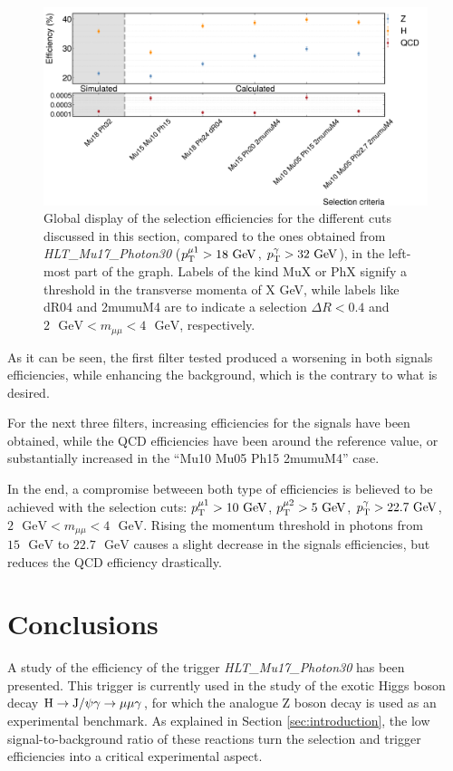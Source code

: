 \documentclass[11pt, a4paper]{article}
\newcommand{\GeV}{\textrm{ }\mathrm{GeV}}
\renewcommand{\H}{{\rm H}}
\newcommand{\JPsi}{{\rm J}/\psi}
\newcommand{\pt}{p_{\rm T}}
\begin{document}
\begin{figure}[htbp]
    \centering
    \includegraphics[width=1\linewidth]{images/eff_comparison.pdf}
    \caption{Global display of the selection efficiencies for the different cuts discussed in this section, compared to the ones obtained from {\it HLT\_Mu17\_Photon30} ($\pt^{\mu 1} > 18\GeV$, $\pt^{\gamma} > 32\GeV$), in the left-most part of the graph. Labels of the kind MuX or PhX signify a threshold in the transverse momenta of X GeV, while labels like dR04 and 2mumuM4 are to indicate a selection $\Delta R < 0.4$ and $2\GeV < m_{\mu\mu} < 4\GeV$, respectively.
    \label{im:eff_comparison}}
\end{figure}

As it can be seen, the first filter tested produced a worsening in both signals efficiencies, while enhancing the background, which is the contrary to what is desired.

For the next three filters, increasing efficiencies for the signals have been obtained, while the QCD efficiencies have been around the reference value, or substantially increased in the ``Mu10 Mu05 Ph15 2mumuM4'' case.

In the end, a compromise betweeen both type of efficiencies is believed to be achieved with the selection cuts: $\pt^{\mu 1} > 10\GeV$, $\pt^{\mu 2} > 5\GeV$, $\pt^{\gamma} > 22.7\GeV$, $2\GeV < m_{\mu\mu} < 4\GeV$. Rising the momentum threshold in photons from $15\GeV$ to $22.7\GeV$ causes a slight decrease in the signals efficiencies, but reduces the QCD efficiency drastically.

\section{Conclusions}

A study of the efficiency of the trigger {\it HLT\_Mu17\_Photon30} has been presented. This trigger is currently used in the study of the exotic Higgs boson decay $\H \rightarrow \JPsi\gamma \rightarrow \mu\mu\gamma$, for which the analogue Z boson decay is used as an experimental benchmark. As explained in Section \ref{sec:introduction}, the low signal-to-background ratio of these reactions turn the selection and trigger efficiencies into a critical experimental aspect.
\end{document}
